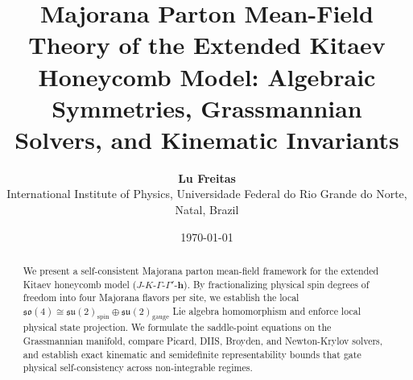 \documentclass[11pt,a4paper]{article}
\title{\textbf{Majorana Parton Mean-Field Theory of the Extended Kitaev Honeycomb Model: Algebraic Symmetries, Grassmannian Solvers, and Kinematic Invariants}}
\author{\textbf{Lu Freitas}\\[1mm]
\small International Institute of Physics, Universidade Federal do Rio Grande do Norte, Natal, Brazil}
\date{\today}
\begin{document}
\maketitle

\begin{abstract}
We present a self-consistent Majorana parton mean-field framework for the extended Kitaev honeycomb model ($J\text{-}K\text{-}\Gamma\text{-}\Gamma'\text{-}\mathbf{h}$). By fractionalizing physical spin degrees of freedom into four Majorana flavors per site, we establish the local $\mathfrak{so}(4) \cong \mathfrak{su}(2)_{\mathrm{spin}} \oplus \mathfrak{su}(2)_{\mathrm{gauge}}$ Lie algebra homomorphism and enforce local physical state projection. We formulate the saddle-point equations on the Grassmannian manifold, compare Picard, DIIS, Broyden, and Newton-Krylov solvers, and establish exact kinematic and semidefinite representability bounds that gate physical self-consistency across non-integrable regimes.
\end{abstract}

\tableofcontents
\newpage





\end{document}
